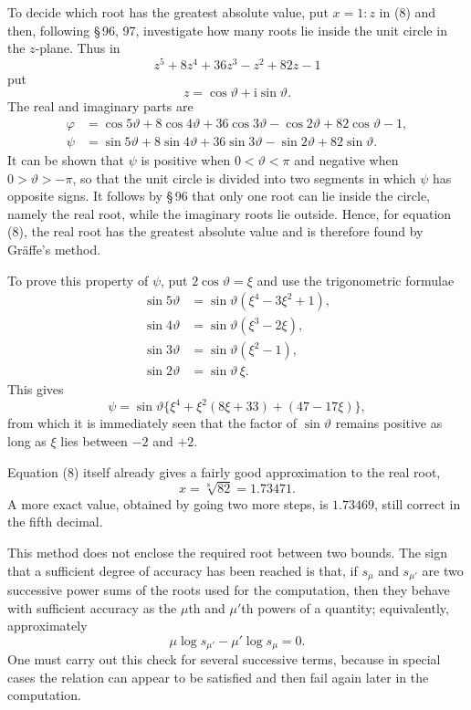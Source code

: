 \documentclass[11pt]{article}
\providecommand{\ii}{\mathrm{i}}
\begin{document}
To decide which root has the greatest absolute value, put $x=1:z$ in (8) and then, following \S\,96, 97, investigate how many roots lie inside the unit circle in the $z$-plane. Thus in
\[
        z^5+8z^4+36z^3-z^2+82z-1
\]
put
\[
        z=\cos\vartheta+\ii\sin\vartheta.
\]
The real and imaginary parts are
\[
\begin{aligned}
\varphi&=\cos5\vartheta+8\cos4\vartheta+36\cos3\vartheta
        -\cos2\vartheta+82\cos\vartheta-1,\\
\psi&=\sin5\vartheta+8\sin4\vartheta+36\sin3\vartheta
        -\sin2\vartheta+82\sin\vartheta.
\end{aligned}
\]
It can be shown that $\psi$ is positive when $0<\vartheta<\pi$ and negative when $0>\vartheta>-\pi$, so that the unit circle is divided into two segments in which $\psi$ has opposite signs. It follows by \S\,96 that only one root can lie inside the circle, namely the real root, while the imaginary roots lie outside. Hence, for equation (8), the real root has the greatest absolute value and is therefore found by Gräffe's method.

To prove this property of $\psi$, put $2\cos\vartheta=\xi$ and use the trigonometric formulae
\[
\begin{aligned}
\sin5\vartheta&=\sin\vartheta(\xi^4-3\xi^2+1),\\
\sin4\vartheta&=\sin\vartheta(\xi^3-2\xi),\\
\sin3\vartheta&=\sin\vartheta(\xi^2-1),\\
\sin2\vartheta&=\sin\vartheta\,\xi.
\end{aligned}
\]
This gives
\[
        \psi=\sin\vartheta\{\xi^4+\xi^2(8\xi+33)+(47-17\xi)\},
\]
from which it is immediately seen that the factor of $\sin\vartheta$ remains positive as long as $\xi$ lies between $-2$ and $+2$.

Equation (8) itself already gives a fairly good approximation to the real root,
\[
        x=\sqrt[8]{82}=1.73471.
\]
A more exact value, obtained by going two more steps, is $1.73469$, still correct in the fifth decimal.

This method does not enclose the required root between two bounds. The sign that a sufficient degree of accuracy has been reached is that, if $s_\mu$ and $s_{\mu'}$ are two successive power sums of the roots used for the computation, then they behave with sufficient accuracy as the $\mu$th and $\mu'$th powers of a quantity; equivalently, approximately
\[
        \mu\log s_{\mu'}-\mu'\log s_\mu=0.
\]
One must carry out this check for several successive terms, because in special cases the relation can appear to be satisfied and then fail again later in the computation.
\end{document}
